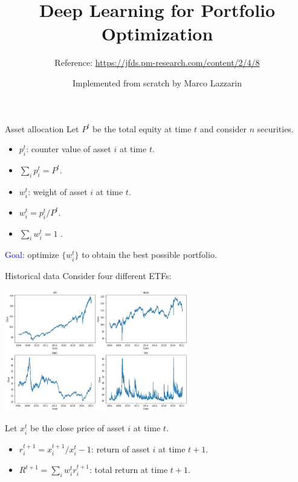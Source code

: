 \documentclass[pdf]{beamer}
\begin{document}
	\begin{frame}
		\title{Deep Learning for Portfolio Optimization}
		\author{Reference: \url{https://jfds.pm-research.com/content/2/4/8}}
		\date{Implemented from scratch by Marco Lazzarin}
		\titlepage
	\end{frame}



	\begin{frame}{Asset allocation}
		Let $P^t$ be the total equity at time $t$ and consider $n$ securities.
		\begin{itemize}
			\item $p_i^t$: counter value of asset $i$ at time $t$.
			\item $\sum_i p_i^t = P^t$.
			\item $w_i^t$: weight of asset $i$ at time $t$.
			\item $w_i^t = p_i^t / P^t$.
			\item $\sum_i w_i^t = 1$ .
		\end{itemize}
		\textcolor{blue}{Goal:} optimize $\{ w_i^t \}$ to obtain the \alert{best} possible portfolio.
	\end{frame}

	\begin{frame}{Historical data}
		Consider four different ETFs:

		\centering
		\includegraphics[width=0.6\textwidth]{historical_data.png}

		\raggedright
		Let $x_i^t$ be the close price of asset $i$ at time $t$.
		\begin{itemize}
			\item $r_i^{t+1} = x_i^{t+1}/x_i^t - 1$: return of asset $i$ at time $t+1$.
			\item $R^{t+1} = \sum_i w_i^t r_i^{t+1}$: total return at time $t+1$.
		\end{itemize}
	\end{frame}
\end{document}
